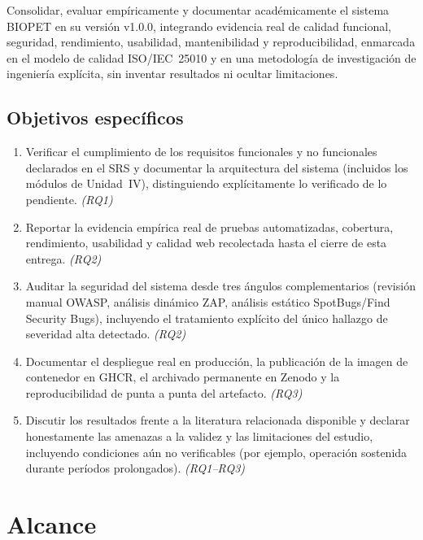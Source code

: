 Consolidar, evaluar emp\'iricamente y documentar acad\'emicamente el sistema
BIOPET en su versi\'on v1.0.0, integrando evidencia real de calidad
funcional, seguridad, rendimiento, usabilidad, mantenibilidad y
reproducibilidad, enmarcada en el modelo de calidad ISO/IEC~25010 y en una
metodolog\'ia de investigaci\'on de ingenier\'ia expl\'icita, sin inventar
resultados ni ocultar limitaciones.

\subsection*{Objetivos espec\'ificos}
\begin{enumerate}[nosep]
  \item Verificar el cumplimiento de los requisitos funcionales y no
    funcionales declarados en el SRS y documentar la arquitectura del
    sistema (incluidos los m\'odulos de Unidad~IV), distinguiendo
    expl\'icitamente lo verificado de lo pendiente. \emph{(RQ1)}
  \item Reportar la evidencia emp\'irica real de pruebas automatizadas,
    cobertura, rendimiento, usabilidad y calidad web recolectada hasta el
    cierre de esta entrega. \emph{(RQ2)}
  \item Auditar la seguridad del sistema desde tres \'angulos
    complementarios (revisi\'on manual OWASP, an\'alisis din\'amico ZAP,
    an\'alisis est\'atico SpotBugs/Find Security Bugs), incluyendo el
    tratamiento expl\'icito del \'unico hallazgo de severidad alta
    detectado. \emph{(RQ2)}
  \item Documentar el despliegue real en producci\'on, la publicaci\'on de
    la imagen de contenedor en GHCR, el archivado permanente en Zenodo y
    la reproducibilidad de punta a punta del artefacto. \emph{(RQ3)}
  \item Discutir los resultados frente a la literatura relacionada
    disponible y declarar honestamente las amenazas a la validez y las
    limitaciones del estudio, incluyendo condiciones a\'un no verificables
    (por ejemplo, operaci\'on sostenida durante per\'iodos prolongados).
    \emph{(RQ1--RQ3)}
\end{enumerate}

\section{Alcance}

